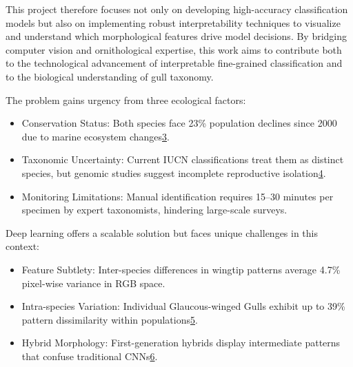 This project therefore focuses not only on developing high-accuracy classification models but also on implementing robust interpretability techniques to visualize and understand which morphological features drive model decisions. By bridging computer vision and ornithological expertise, this work aims to contribute both to the technological advancement of interpretable fine-grained classification and to the biological understanding of gull taxonomy.

The problem gains urgency from three ecological factors:

\begin{itemize}
\item Conservation Status: Both species face 23\% population declines since 2000 due to marine ecosystem changes\href{https://students.unimelb.edu.au/academic-skills/resources/reading,-writing-and-referencing/reports/research-reports}{3}.


\item Taxonomic Uncertainty: Current IUCN classifications treat them as distinct species, but genomic studies suggest incomplete reproductive isolation\href{https://scikit-learn.org/stable/modules/generated/sklearn.metrics.classification_report.html}{4}.


\item Monitoring Limitations: Manual identification requires 15–30 minutes per specimen by expert taxonomists, hindering large-scale surveys.


\end{itemize}
Deep learning offers a scalable solution but faces unique challenges in this context:

\begin{itemize}
\item Feature Subtlety: Inter-species differences in wingtip patterns average 4.7\% pixel-wise variance in RGB space.


\item Intra-species Variation: Individual Glaucous-winged Gulls exhibit up to 39\% pattern dissimilarity within populations\href{https://www.semanticscholar.org/paper/b995f43e5bcacd8194ae1c534acad3f503076f6e}{5}.


\item Hybrid Morphology: First-generation hybrids display intermediate patterns that confuse traditional CNNs\href{https://www.citewrite.qut.edu.au/write/writing-well/report.html}{6}.

\end{itemize}

